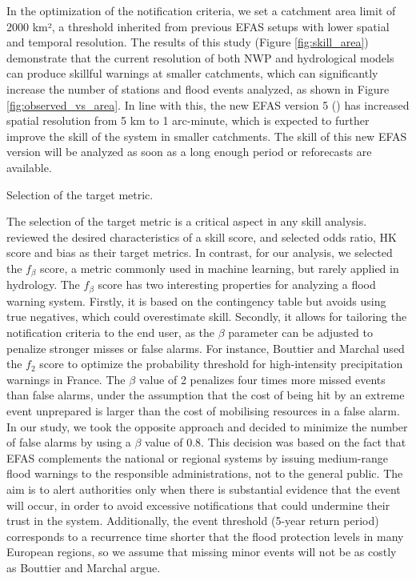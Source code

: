 \documentclass[preprint,12pt,authoryear]{elsarticle}
\begin{document}
In the optimization of the notification criteria, we set a catchment area limit of 2000 km², a threshold inherited from previous EFAS setups with lower spatial and temporal resolution. The results of this study (Figure \ref{fig:skill_area}) demonstrate that the current resolution of both NWP and hydrological models can produce skillful warnings at smaller catchments, which can significantly increase the number of stations and flood events analyzed, as shown in Figure \ref{fig:observed_vs_area}. In line with this, the new EFAS version 5 (\cite{EFASv5.0}) has increased spatial resolution from 5 km to 1 arc-minute, which is expected to further improve the skill of the system in smaller catchments. The skill of this new EFAS version will be analyzed as soon as a long enough period or reforecasts are available.

Selection of the target metric.

The selection of the target metric is a critical aspect in any skill analysis. \cite{Bartholmes2009} reviewed the desired characteristics of a skill score, and selected odds ratio, HK score and bias as their target metrics. In contrast, for our analysis, we selected the $f_{\beta}$ score, a metric commonly used in machine learning, but rarely applied in hydrology. The $f_{\beta}$ score has two interesting properties for analyzing a flood warning system. Firstly, it is based on the contingency table but avoids using true negatives, which could overestimate skill. Secondly, it allows for tailoring the notification criteria to the end user, as the $\beta$ parameter can be adjusted to penalize stronger misses or false alarms. For instance, Bouttier and Marchal \cite{Bouttier2023} used the $f_2$ score to optimize the probability threshold for high-intensity precipitation warnings in France. The $\beta$ value of 2 penalizes four times more missed events than false alarms, under the assumption that the cost of  being hit by an extreme event unprepared is larger than the cost of mobilising resources in a false alarm. In our study, we took the opposite approach and decided to minimize the number of false alarms by using a $\beta$ value of $0.8$. This decision was based on the fact that EFAS complements the national or regional systems by issuing medium-range flood warnings to the responsible administrations, not to the general public. The aim is to alert authorities only when there is substantial evidence that the event will occur, in order to avoid excessive notifications that could undermine their trust in the system. Additionally, the event threshold (5-year return period) corresponds to a recurrence time shorter that the flood protection levels in many European regions, so we assume that missing minor events will not be as costly as Bouttier and Marchal argue.
\end{document}
